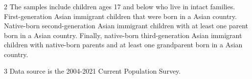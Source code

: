 \begin{table}[!h]
{\begin{threeparttable}
\begin{tablenotes}
\item[2] \footnotesize{The samples include children ages 17 and below who live in intact families. 
                      First-generation Asian immigrant children that were born in a 
                      Asian country. Native-born second-generation Asian 
                      immigrant children with at least one parent born in a Asian 
                      country. Finally, native-born third-generation Asian immigrant children 
                      with native-born parents and at least one grandparent born in a Asian country.}
\item[3] \footnotesize{Data source is the 2004-2021 Current Population Survey.}
\end{tablenotes}
\end{threeparttable}}
\end{table}
